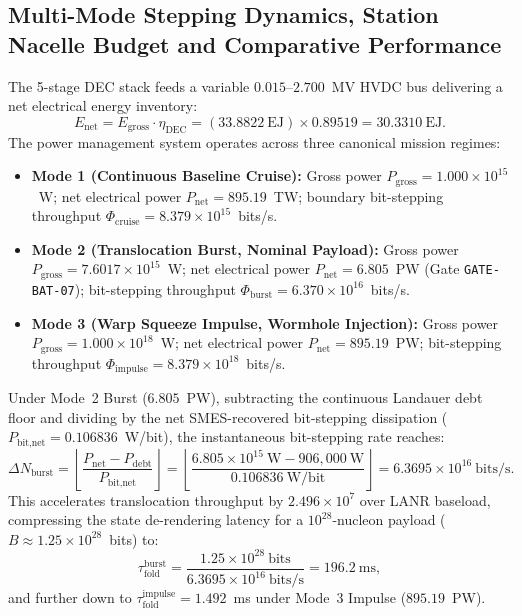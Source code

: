 \documentclass[11pt,onecolumn]{article}
\begin{document}
\FloatBarrier
\subsection{Multi-Mode Stepping Dynamics, Station Nacelle Budget and Comparative Performance}
The 5-stage DEC stack feeds a variable $0.015\text{--}2.700$~MV HVDC bus delivering a net electrical energy inventory:
\begin{equation}
E_{\text{net}} = E_{\text{gross}} \cdot \eta_{\text{DEC}} = (33.8822~\text{EJ}) \times 0.89519 = 30.3310~\text{EJ}.
\end{equation}
The power management system operates across three canonical mission regimes:
\begin{itemize}
    \item \textbf{Mode 1 (Continuous Baseline Cruise):} Gross power $P_{\text{gross}} = 1.000\times 10^{15}$~W; net electrical power $P_{\text{net}} = 895.19$~TW; boundary bit-stepping throughput $\Phi_{\text{cruise}} = 8.379\times 10^{15}$~bits/s.
    \item \textbf{Mode 2 (Translocation Burst, Nominal Payload):} Gross power $P_{\text{gross}} = 7.6017\times 10^{15}$~W; net electrical power $P_{\text{net}} = 6.805$~PW (Gate \texttt{GATE-BAT-07}); bit-stepping throughput $\Phi_{\text{burst}} = 6.370\times 10^{16}$~bits/s.
    \item \textbf{Mode 3 (Warp Squeeze Impulse, Wormhole Injection):} Gross power $P_{\text{gross}} = 1.000\times 10^{18}$~W; net electrical power $P_{\text{net}} = 895.19$~PW; bit-stepping throughput $\Phi_{\text{impulse}} = 8.379\times 10^{18}$~bits/s.
\end{itemize}
Under Mode~2 Burst ($6.805$~PW), subtracting the continuous Landauer debt floor and dividing by the net SMES-recovered bit-stepping dissipation ($P_{\text{bit,net}} = 0.106836$~W/bit), the instantaneous bit-stepping rate reaches:
\begin{equation}
\Delta N_{\text{burst}} = \left\lfloor \frac{P_{\text{net}} - P_{\text{debt}}}{P_{\text{bit,net}}} \right\rfloor = \left\lfloor \frac{6.805\times 10^{15}~\text{W} - 906{,}000~\text{W}}{0.106836~\text{W/bit}} \right\rfloor = 6.3695 \times 10^{16}~\text{bits/s}.
\end{equation}
This accelerates translocation throughput by $2.496\times 10^7$ over LANR baseload, compressing the state de-rendering latency for a $10^{28}$-nucleon payload ($B \approx 1.25\times 10^{28}$~bits) to:
\begin{equation}
\tau_{\text{fold}}^{\text{burst}} = \frac{1.25 \times 10^{28}~\text{bits}}{6.3695 \times 10^{16}~\text{bits/s}} = 196.2~\text{ms},
\end{equation}
and further down to $\tau_{\text{fold}}^{\text{impulse}} = 1.492$~ms under Mode~3 Impulse ($895.19$~PW).
\end{document}
